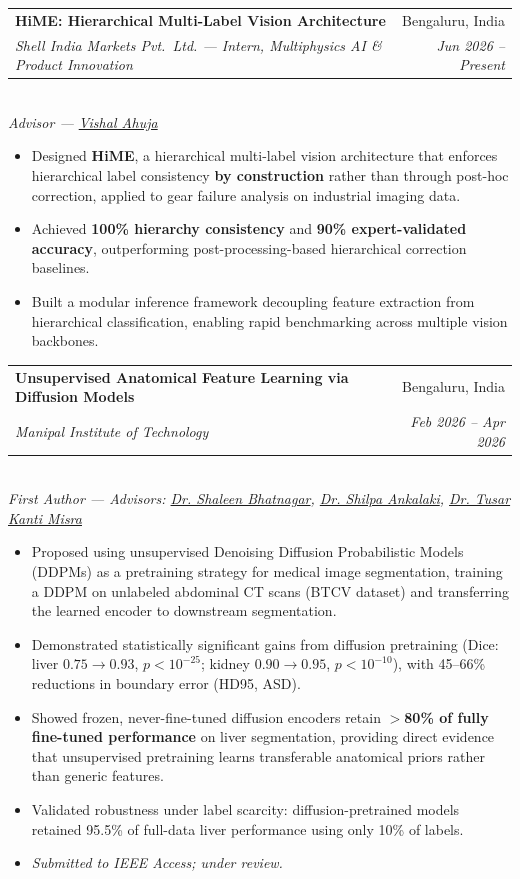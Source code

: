 \documentclass[a4paper,11pt]{article}
\makeatletter
\newcommand{\resumeItem}[1]{
  \item\normalsize{#1}
}
\newcommand{\resumeSubheadingAdv}[5]{
  \needspace{5\baselineskip}
  \vspace{1pt}\item
  \begin{tabular*}{0.97\textwidth}[t]{l@{\extracolsep{\fill}}r}
    \textbf{#1} & #2 \\
    \textit{\small #3} & \textit{\small #4} \\
  \end{tabular*}\\
  \textit{\small #5}\vspace{-4pt}
}
\newcommand{\resumeItemListStart}{\begin{itemize}[leftmargin=0.2in, itemsep=1.5pt, topsep=3pt]}
\newcommand{\resumeItemListEnd}{\end{itemize}\vspace{0pt}}
\makeatother
\begin{document}
\resumeSubheadingAdv
  {HiME: Hierarchical Multi-Label Vision Architecture}{Bengaluru, India}
  {Shell India Markets Pvt.\ Ltd. --- Intern, Multiphysics AI \& Product Innovation}{Jun 2026 -- Present}
  {Advisor --- \href{https://scholar.google.com/citations?hl=en\&user=9DnqPAcAAAAJ}{Vishal Ahuja}}
  \resumeItemListStart
    \resumeItem{Designed \textbf{HiME}, a hierarchical multi-label vision architecture that enforces hierarchical label consistency \textbf{by construction} rather than through post-hoc correction, applied to gear failure analysis on industrial imaging data.}
    \resumeItem{Achieved \textbf{100\% hierarchy consistency} and \textbf{90\% expert-validated accuracy}, outperforming post-processing-based hierarchical correction baselines.}
    \resumeItem{Built a modular inference framework decoupling feature extraction from hierarchical classification, enabling rapid benchmarking across multiple vision backbones.}
  \resumeItemListEnd



\resumeSubheadingAdv
  {Unsupervised Anatomical Feature Learning via Diffusion Models}{Bengaluru, India}
  {Manipal Institute of Technology}{Feb 2026 -- Apr 2026}
  {First Author --- Advisors: \href{https://scholar.google.com/citations?user=oEcWbAIAAAAJ\&hl=en}{Dr. Shaleen Bhatnagar}, \href{https://scholar.google.com/citations?user=EyEzinAAAAAJ\&hl=en}{Dr. Shilpa Ankalaki}, \href{https://scholar.google.co.in/citations?hl=en\&user=djknKEYAAAAJ}{Dr. Tusar Kanti Misra}}
  \resumeItemListStart
    \resumeItem{Proposed using unsupervised Denoising Diffusion Probabilistic Models (DDPMs) as a pretraining strategy for medical image segmentation, training a DDPM on unlabeled abdominal CT scans (BTCV dataset) and transferring the learned encoder to downstream segmentation.}
    \resumeItem{Demonstrated statistically significant gains from diffusion pretraining (Dice: liver $0.75\!\to\!0.93$, $p<10^{-25}$; kidney $0.90\!\to\!0.95$, $p<10^{-10}$), with 45--66\% reductions in boundary error (HD95, ASD).}
    \resumeItem{Showed frozen, never-fine-tuned diffusion encoders retain \textbf{$>$80\% of fully fine-tuned performance} on liver segmentation, providing direct evidence that unsupervised pretraining learns transferable anatomical priors rather than generic features.}
    \resumeItem{Validated robustness under label scarcity: diffusion-pretrained models retained 95.5\% of full-data liver performance using only 10\% of labels.}
    \resumeItem{\textit{Submitted to IEEE Access; under review.}}
  \resumeItemListEnd
\end{document}
